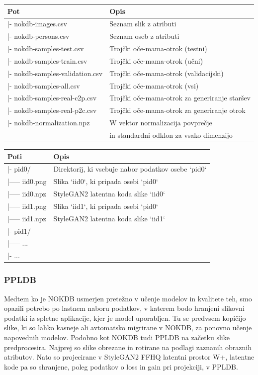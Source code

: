 \documentclass[a4paper,12pt,openright]{book}
\begin{document}
\begin{center}
  \begin{tabular}{|l|l|}
  \hline
  Pot & Opis \\
  \hline
  |- nokdb-images.csv & Seznam slik z atributi \\
  |- nokdb-persons.csv & Seznam oseb z atributi \\
  |- nokdb-samples-test.csv & Trojčki oče-mama-otrok (testni) \\
  |- nokdb-samples-train.csv & Trojčki oče-mama-otrok (učni) \\
  |- nokdb-samples-validation.csv & Trojčki oče-mama-otrok (validacijski) \\
  |- nokdb-samples-all.csv & Trojčki oče-mama-otrok (vsi) \\
  |- nokdb-samples-real-c2p.csv & Trojčki oče-mama-otrok za generiranje staršev \\
  |- nokdb-samples-real-p2c.csv & Trojčki oče-mama-otrok za generiranje otrok \\
  |- nokdb-normalization.npz & W vektor normalizacija povprečje \\ & in standardni odklon za vsako dimenzijo \\
  \hline
  \end{tabular}
\end{center}

\begin{center}
  \begin{tabular}{|l|l|}
  \hline
  Poti & Opis \\
  \hline
  |- pid0/ & Direktorij, ki vsebuje nabor podatkov osebe `pid0` \\
  |----- iid0.png & Slika `iid0`, ki pripada osebi `pid0` \\
  |----- iid0.npz & StyleGAN2 latentna koda slike `iid0` \\
  |----- iid1.png & Slika `iid1`, ki pripada osebi `pid0`\\
  |----- iid1.npz & StyleGAN2 latentna koda slike `iid1`\\
  |- pid1/ & \\
  |----- ... & \\
  |- ... & \\
  \hline
  \end{tabular}
\end{center}


\subsubsection{PPLDB}
Medtem ko je NOKDB usmerjen pretežno v učenje modelov in kvalitete teh, smo opazili potrebo po lastnem naboru podatkov, v katerem bodo hranjeni slikovni podatki iz spletne aplikacije, kjer je model uporabljen. Tu se predvsem kopičijo slike, ki so lahko kasneje ali avtomatsko migrirane v NOKDB, za ponovno učenje napovednih modelov. Podobno kot NOKDB tudi PPLDB na začetku slike predprocesira. Najprej so slike obrezane in rotirane na podlagi zaznanih obraznih atributov. Nato so projecirane v StyleGAN2 FFHQ latentni prostor W+, latentne kode pa so shranjene, poleg podatkov o loss in gain pri projekciji, v PPLDB.  
\end{document}
